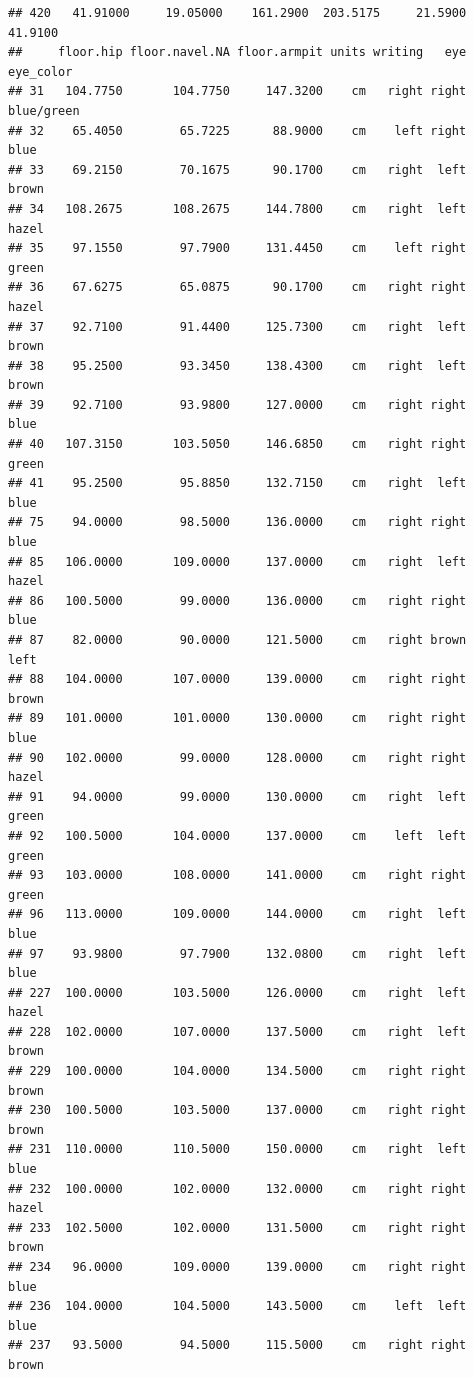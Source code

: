 \documentclass[]{article}
\begin{document}
\begin{verbatim}
## 420   41.91000     19.05000    161.2900  203.5175     21.5900       41.9100
##     floor.hip floor.navel.NA floor.armpit units writing   eye  eye_color
## 31   104.7750       104.7750     147.3200    cm   right right blue/green
## 32    65.4050        65.7225      88.9000    cm    left right       blue
## 33    69.2150        70.1675      90.1700    cm   right  left      brown
## 34   108.2675       108.2675     144.7800    cm   right  left      hazel
## 35    97.1550        97.7900     131.4450    cm    left right      green
## 36    67.6275        65.0875      90.1700    cm   right right      hazel
## 37    92.7100        91.4400     125.7300    cm   right  left      brown
## 38    95.2500        93.3450     138.4300    cm   right  left      brown
## 39    92.7100        93.9800     127.0000    cm   right right       blue
## 40   107.3150       103.5050     146.6850    cm   right right      green
## 41    95.2500        95.8850     132.7150    cm   right  left       blue
## 75    94.0000        98.5000     136.0000    cm   right right       blue
## 85   106.0000       109.0000     137.0000    cm   right  left      hazel
## 86   100.5000        99.0000     136.0000    cm   right right       blue
## 87    82.0000        90.0000     121.5000    cm   right brown       left
## 88   104.0000       107.0000     139.0000    cm   right right      brown
## 89   101.0000       101.0000     130.0000    cm   right right       blue
## 90   102.0000        99.0000     128.0000    cm   right right      hazel
## 91    94.0000        99.0000     130.0000    cm   right  left      green
## 92   100.5000       104.0000     137.0000    cm    left  left      green
## 93   103.0000       108.0000     141.0000    cm   right right      green
## 96   113.0000       109.0000     144.0000    cm   right  left       blue
## 97    93.9800        97.7900     132.0800    cm   right  left       blue
## 227  100.0000       103.5000     126.0000    cm   right  left      hazel
## 228  102.0000       107.0000     137.5000    cm   right  left      brown
## 229  100.0000       104.0000     134.5000    cm   right right      brown
## 230  100.5000       103.5000     137.0000    cm   right right      brown
## 231  110.0000       110.5000     150.0000    cm   right  left       blue
## 232  100.0000       102.0000     132.0000    cm   right right      hazel
## 233  102.5000       102.0000     131.5000    cm   right right      brown
## 234   96.0000       109.0000     139.0000    cm   right right       blue
## 236  104.0000       104.5000     143.5000    cm    left  left       blue
## 237   93.5000        94.5000     115.5000    cm   right right      brown

\end{verbatim}
\end{document}
